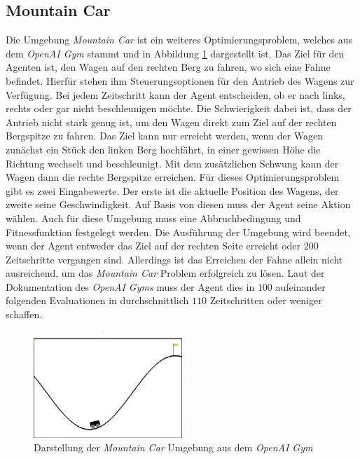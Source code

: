 \subsection{Mountain Car}
\label{subsec:analysis_mountain_car}
Die Umgebung \emph{Mountain Car} ist ein weiteres Optimierungsproblem, welches aus dem \emph{OpenAI Gym} stammt und in Abbildung \ref{fig:mountain_car_env} dargestellt ist. Das Ziel für den Agenten ist, den Wagen auf den rechten Berg zu fahren, wo sich eine Fahne befindet. Hierfür stehen ihm Steuerungsoptionen für den Antrieb des Wagens zur Verfügung. Bei jedem Zeitschritt kann der Agent entscheiden, ob er nach links, rechts oder gar nicht beschleunigen möchte. Die Schwierigkeit dabei ist, dass der Antrieb nicht stark genug ist, um den Wagen direkt zum Ziel auf der rechten Bergspitze zu fahren. Das Ziel kann nur erreicht werden, wenn der Wagen zunächst ein Stück den linken Berg hochfährt, in einer gewissen Höhe die Richtung wechselt und beschleunigt. Mit dem zusätzlichen Schwung kann der Wagen dann die rechte Bergspitze erreichen. Für dieses Optimierungsproblem gibt es zwei Eingabewerte. Der erste ist die aktuelle Position des Wagens, der zweite seine Geschwindigkeit. Auf Basis von diesen muss der Agent seine Aktion wählen. Auch für diese Umgebung muss eine Abbruchbedingung und Fitnessfunktion festgelegt werden. Die Ausführung der Umgebung wird beendet, wenn der Agent entweder das Ziel auf der rechten Seite erreicht oder $200$ Zeitschritte vergangen sind. Allerdings ist das Erreichen der Fahne allein nicht ausreichend, um das \emph{Mountain Car} Problem erfolgreich zu lösen. Laut der Dokumentation des \emph{OpenAI Gyms} muss der Agent dies in $100$ aufeinander folgenden Evaluationen in durchschnittlich $110$ Zeitschritten oder weniger schaffen.
\begin{figure}[!h]
	\centering
	\includegraphics[width=0.5\textwidth]{./img/mountain_car_env.JPG} 
	\caption{Darstellung der \emph{Mountain Car} Umgebung aus dem \emph{OpenAI Gym}}
	\label{fig:mountain_car_env}
\end{figure} 
\\\\
